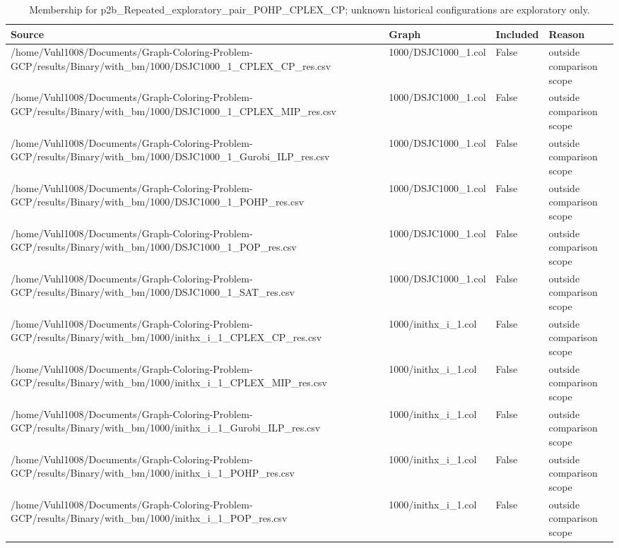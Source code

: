 \begin{table}[htbp]
\centering
\caption{Membership for p2b\_Repeated\_exploratory\_pair\_POHP\_CPLEX\_CP; unknown historical configurations are exploratory only.}
\label{tab:p2b-Repeated-exploratory-pair-POHP-CPLEX-CP-membership}
\begin{tabular}{llll}
\hline
Source & Graph & Included & Reason \\
\hline
/home/Vuhl1008/Documents/Graph-Coloring-Problem-GCP/results/Binary/with\_bm/1000/DSJC1000\_1\_CPLEX\_CP\_res.csv & 1000/DSJC1000\_1.col & False & outside comparison scope \\
/home/Vuhl1008/Documents/Graph-Coloring-Problem-GCP/results/Binary/with\_bm/1000/DSJC1000\_1\_CPLEX\_MIP\_res.csv & 1000/DSJC1000\_1.col & False & outside comparison scope \\
/home/Vuhl1008/Documents/Graph-Coloring-Problem-GCP/results/Binary/with\_bm/1000/DSJC1000\_1\_Gurobi\_ILP\_res.csv & 1000/DSJC1000\_1.col & False & outside comparison scope \\
/home/Vuhl1008/Documents/Graph-Coloring-Problem-GCP/results/Binary/with\_bm/1000/DSJC1000\_1\_POHP\_res.csv & 1000/DSJC1000\_1.col & False & outside comparison scope \\
/home/Vuhl1008/Documents/Graph-Coloring-Problem-GCP/results/Binary/with\_bm/1000/DSJC1000\_1\_POP\_res.csv & 1000/DSJC1000\_1.col & False & outside comparison scope \\
/home/Vuhl1008/Documents/Graph-Coloring-Problem-GCP/results/Binary/with\_bm/1000/DSJC1000\_1\_SAT\_res.csv & 1000/DSJC1000\_1.col & False & outside comparison scope \\
/home/Vuhl1008/Documents/Graph-Coloring-Problem-GCP/results/Binary/with\_bm/1000/inithx\_i\_1\_CPLEX\_CP\_res.csv & 1000/inithx\_i\_1.col & False & outside comparison scope \\
/home/Vuhl1008/Documents/Graph-Coloring-Problem-GCP/results/Binary/with\_bm/1000/inithx\_i\_1\_CPLEX\_MIP\_res.csv & 1000/inithx\_i\_1.col & False & outside comparison scope \\
/home/Vuhl1008/Documents/Graph-Coloring-Problem-GCP/results/Binary/with\_bm/1000/inithx\_i\_1\_Gurobi\_ILP\_res.csv & 1000/inithx\_i\_1.col & False & outside comparison scope \\
/home/Vuhl1008/Documents/Graph-Coloring-Problem-GCP/results/Binary/with\_bm/1000/inithx\_i\_1\_POHP\_res.csv & 1000/inithx\_i\_1.col & False & outside comparison scope \\
/home/Vuhl1008/Documents/Graph-Coloring-Problem-GCP/results/Binary/with\_bm/1000/inithx\_i\_1\_POP\_res.csv & 1000/inithx\_i\_1.col & False & outside comparison scope \\

\end{tabular}
\end{table}
